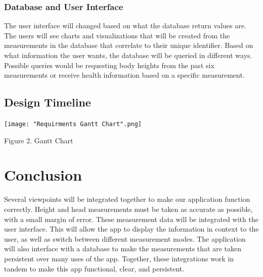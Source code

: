 \documentclass[onecolumn, draftclsnofoot,10pt, compsoc]{IEEEtran}
\begin{document}
\subsubsection{Database and User Interface}
The user interface will changed based on what the database return values are. The users will see charts and visualizations that will be created from the measurements in the database that correlate to their unique identifier. Based on what information the user wants, the database will be queried in different ways. Possible queries would be requesting body heights from the past six measurements or receive health information based on a specific measurement.


\subsection{Design Timeline}
 	{\texttt{[image: "Requirments Gantt Chart".png]}}\par
	{Figure 2. Gantt Chart}

\section{Conclusion}
Several viewpoints will be integrated together to make our application function correctly. Height and head measurements must be taken as accurate as possible, with a small margin of error. These measurement data will be integrated with the user interface. This will allow the app to display the information in context to the user, as well as switch between different measurement modes. The application will also interface with a database to make the measurements that are taken persistent over many uses of the app. Together, these integrations work in tandem to make this app functional, clear, and persistent. 


\clearpage


\end{document}
